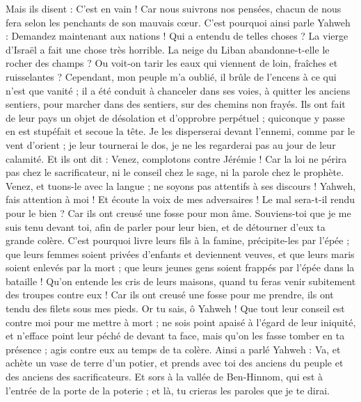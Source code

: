 \begin{multicols}{2}
Mais ils disent : C'est en vain ! Car nous suivrons nos pensées, chacun de nous fera selon les penchants de son mauvais cœur.
C'est pourquoi ainsi parle Yahweh : Demandez maintenant aux nations ! Qui a entendu de telles choses ? La vierge d'Israël a fait une chose très horrible.
La neige du Liban abandonne-t-elle le rocher des champs ? Ou voit-on tarir les eaux qui viennent de loin, fraîches et ruisselantes ?
Cependant, mon peuple m'a oublié, il brûle de l'encens à ce qui n'est que vanité ; il a été conduit à chanceler dans ses voies, à quitter les anciens sentiers, pour marcher dans des sentiers, sur des chemins non frayés.
Ils ont fait de leur pays un objet de désolation et d'opprobre perpétuel ; quiconque y passe en est stupéfait et secoue la tête.
Je les disperserai devant l'ennemi, comme par le vent d'orient ; je leur tournerai le dos, je ne les regarderai pas au jour de leur calamité.
Et ils ont dit : Venez, complotons contre Jérémie ! Car la loi ne périra pas chez le sacrificateur, ni le conseil chez le sage, ni la parole chez le prophète. Venez, et tuons-le avec la langue ; ne soyons pas attentifs à ses discours !
Yahweh, fais attention à moi ! Et écoute la voix de mes adversaires !
Le mal sera-t-il rendu pour le bien ? Car ils ont creusé une fosse pour mon âme. Souviens-toi que je me suis tenu devant toi, afin de parler pour leur bien, et de détourner d'eux ta grande colère.
C'est pourquoi livre leurs fils à la famine, précipite-les par l'épée ; que leurs femmes soient privées d'enfants et deviennent veuves, et que leurs maris soient enlevés par la mort ; que leurs jeunes gens soient frappés par l'épée dans la bataille !
Qu'on entende les cris de leurs maisons, quand tu feras venir subitement des troupes contre eux ! Car ils ont creusé une fosse pour me prendre, ils ont tendu des filets sous mes pieds.
Or tu sais, ô Yahweh ! Que tout leur conseil est contre moi pour me mettre à mort ; ne sois point apaisé à l'égard de leur iniquité, et n'efface point leur péché de devant ta face, mais qu'on les fasse tomber en ta présence ; agis contre eux au temps de ta colère.
\VerseOne{}Ainsi a parlé Yahweh : Va, et achète un vase de terre d'un potier, et prends avec toi des anciens du peuple et des anciens des sacrificateurs.
Et sors à la vallée de Ben-Hinnom, qui est à l'entrée de la porte de la poterie ; et là, tu crieras les paroles que je te dirai.

\end{multicols}
